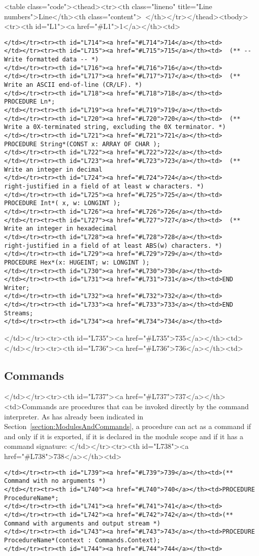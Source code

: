 <table class="code"><thead><tr><th class="lineno" title="Line numbers">Line</th><th class="content"> </th></tr></thead><tbody><tr><th id="L1"><a href="#L1">1</a></th><td>\documentclass[a4paper,11pt]{article}
\begin{document}
\begin{lstlisting}[language=Oberon,frame=none,caption={Simplified Reader and Writer Interface}]
</td></tr><tr><th id="L714"><a href="#L714">714</a></th><td>
</td></tr><tr><th id="L715"><a href="#L715">715</a></th><td>  (** -- Write formatted data -- *)
</td></tr><tr><th id="L716"><a href="#L716">716</a></th><td>
</td></tr><tr><th id="L717"><a href="#L717">717</a></th><td>  (** Write an ASCII end-of-line (CR/LF). *)
</td></tr><tr><th id="L718"><a href="#L718">718</a></th><td>  PROCEDURE Ln*;
</td></tr><tr><th id="L719"><a href="#L719">719</a></th><td>
</td></tr><tr><th id="L720"><a href="#L720">720</a></th><td>  (** Write a 0X-terminated string, excluding the 0X terminator. *)
</td></tr><tr><th id="L721"><a href="#L721">721</a></th><td>  PROCEDURE String*(CONST x: ARRAY OF CHAR );
</td></tr><tr><th id="L722"><a href="#L722">722</a></th><td>
</td></tr><tr><th id="L723"><a href="#L723">723</a></th><td>  (** Write an integer in decimal
</td></tr><tr><th id="L724"><a href="#L724">724</a></th><td>      right-justified in a field of at least w characters. *)
</td></tr><tr><th id="L725"><a href="#L725">725</a></th><td>  PROCEDURE Int*( x, w: LONGINT );
</td></tr><tr><th id="L726"><a href="#L726">726</a></th><td>
</td></tr><tr><th id="L727"><a href="#L727">727</a></th><td>  (** Write an integer in hexadecimal
</td></tr><tr><th id="L728"><a href="#L728">728</a></th><td>      right-justified in a field of at least ABS(w) characters. *)
</td></tr><tr><th id="L729"><a href="#L729">729</a></th><td>  PROCEDURE Hex*(x: HUGEINT; w: LONGINT );
</td></tr><tr><th id="L730"><a href="#L730">730</a></th><td>
</td></tr><tr><th id="L731"><a href="#L731">731</a></th><td>END Writer;
</td></tr><tr><th id="L732"><a href="#L732">732</a></th><td>
</td></tr><tr><th id="L733"><a href="#L733">733</a></th><td>END Streams;
</td></tr><tr><th id="L734"><a href="#L734">734</a></th><td>\end{lstlisting}
</td></tr><tr><th id="L735"><a href="#L735">735</a></th><td>
</td></tr><tr><th id="L736"><a href="#L736">736</a></th><td>\subsection{Commands}
</td></tr><tr><th id="L737"><a href="#L737">737</a></th><td>Commands are procedures that can be invoked directly by the command interpreter. As has already been indicated in Section~\ref{section:ModulesAndCommands}, a procedure can act as a command if and only if it is exported, if it is declared in the module scope and if it has a command signature:
</td></tr><tr><th id="L738"><a href="#L738">738</a></th><td>\begin{lstlisting}[language=Oberon,frame=none,caption={Command Signatures}]
</td></tr><tr><th id="L739"><a href="#L739">739</a></th><td>(** Command with no arguments *)
</td></tr><tr><th id="L740"><a href="#L740">740</a></th><td>PROCEDURE ProcedureName*;
</td></tr><tr><th id="L741"><a href="#L741">741</a></th><td>
</td></tr><tr><th id="L742"><a href="#L742">742</a></th><td>(** Command with arguments and output stream *)
</td></tr><tr><th id="L743"><a href="#L743">743</a></th><td>PROCEDURE ProcedureName*(context : Commands.Context);
</td></tr><tr><th id="L744"><a href="#L744">744</a></th><td>\end{lstlisting}
\end{document}
